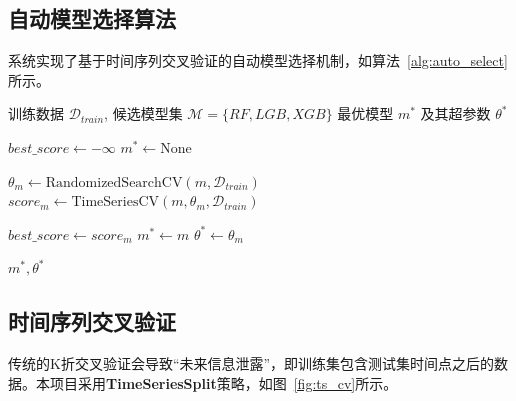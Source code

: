 \subsection{自动模型选择算法}

系统实现了基于时间序列交叉验证的自动模型选择机制，如算法~\ref{alg:auto_select}所示。

\begin{algorithm}[htbp]
    \caption{自动模型选择算法}
    \label{alg:auto_select}
    \begin{algorithmic}[1]
        \Require 训练数据 $\mathcal{D}_{train}$, 候选模型集 $\mathcal{M} = \{RF, LGB, XGB\}$
        \Ensure 最优模型 $m^*$ 及其超参数 $\theta^*$

        \State $best\_score \gets -\infty$
        \State $m^* \gets \text{None}$

        \State $\theta_m \gets \text{RandomizedSearchCV}(m, \mathcal{D}_{train})$ 
        \State $score_m \gets \text{TimeSeriesCV}(m, \theta_m, \mathcal{D}_{train})$ 

        \State $best\_score \gets score_m$
        \State $m^* \gets m$
        \State $\theta^* \gets \theta_m$
        \EndIf
        \EndFor

        \State \Return $m^*, \theta^*$
    \end{algorithmic}
\end{algorithm}

\subsection{时间序列交叉验证}

传统的K折交叉验证会导致``未来信息泄露''，即训练集包含测试集时间点之后的数据。本项目采用\textbf{TimeSeriesSplit}策略，如图~\ref{fig:ts_cv}所示。

